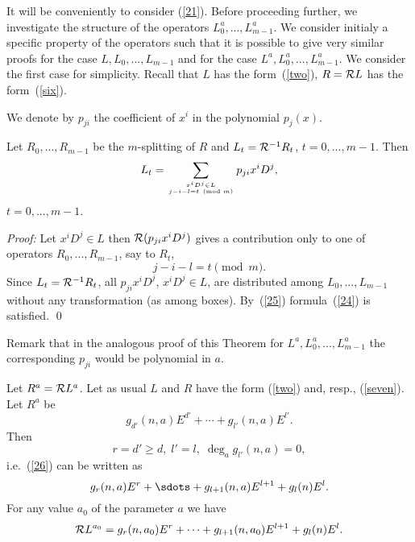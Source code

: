 It will be conveniently to
consider (\ref{21}).
Before proceeding further, we
investigate the structure of the operators
$L_0^a,...,L_{m-1}^a$. We consider initialy a specific property of
the operators such that it is possible to give very similar proofs
for the case $L,L_0,...,L_{m-1}$ and for the case
$L^a,L_0^a,...,L_{m-1}^a$. We consider the first case for simplicity.
Recall that $L$ has the form~(\ref{two}), $R={\cal R}L$ has the
form~(\ref{six}).

We denote by $p_{ji}$ the coefficient of $x^i$ in the
polynomial $p_j(x)$.


\begin{Theorem}
Let $R_0,...,R_{m-1}$ be the
$m$-splitting of $R$ and $L_t={\cal R}^{-1}R_t$, $t=0,...,m-1$. Then
\begin{equation}
\label{24}
L_t=\sum_{{x^iD^j\in L}\atop{j-i-l = t\pmod{m}}} p_{ji}x^iD^j,
\end{equation}
$t=0,...,m-1$.
\end{Theorem}
{\em Proof:\/}
Let $x^iD^j\in L$ then ${\cal R}(p_{ji}x^iD^j)$ gives a contribution
only to one of operators $R_0,...,R_{m-1}$, say to $R_t$,
\begin{equation}
\label{25}
j-i-l=t \pmod{m}.
\end{equation}
Since $L_t={\cal R} ^{-1}R_t$, all $p_{ji}x^iD^j$, $x^iD^j\in L$,
are distributed among $L_0,...,L_{m-1}$ without any transformation
(as among boxes). By~(\ref{25}) formula~(\ref{24}) is satisfied. \qed

Remark that in the analogous proof of this Theorem for
$L^a,L_0^a,...,L_{m-1}^a$ the corresponding $p_{ji}$ would be
polynomial in $a$.

\begin{Theorem}
\label{trco}
Let $R^a={\cal R}L^a$. Let as usual
$L$ and $R$ have the form (\ref{two}) and, resp., (\ref{seven}). Let
$R^a$ be
\begin{equation}
\label{26}
g_{d'}(n,a)E^{d'}+\cdots +g_{l'}(n,a)E^{l'}.
\end{equation}
Then
\begin{equation}
\label{27}
r=d' \ge d,\; l'=l,\; \deg_a g_{l'}(n,a)=0,
\end{equation}
i.e.~(\ref{26}) can be written as
\begin{equation}
\label{28}
g_r(n,a)E^r+\sdots +g_{l+1}(n,a)E^{l+1}+g_{l}(n)E^l.
\end{equation}
For any value $a_0$ of the parameter $a$ we have
\begin{equation}
\label{29}
{\cal
R}L^{a_0}=g_r(n,a_0)E^r+\cdots +g_{l+1}(n,a_0)E^{l+1}+g_{l}(n)E^l.
\end{equation}
\end{Theorem}

